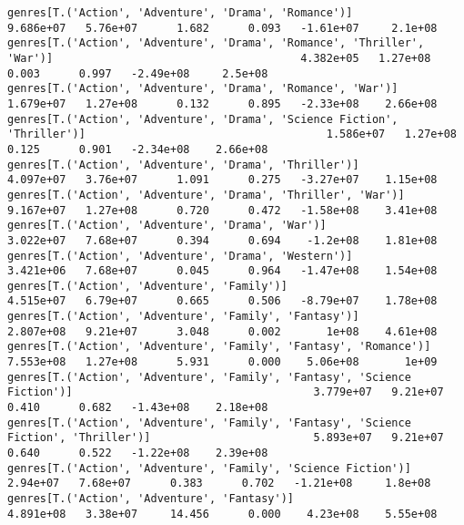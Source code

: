 \documentclass[11pt]{article}
\begin{document}
\begin{Verbatim}[commandchars=\\\{\}]
genres[T.('Action', 'Adventure', 'Drama', 'Romance')]                                                         9.686e+07   5.76e+07      1.682      0.093   -1.61e+07     2.1e+08
genres[T.('Action', 'Adventure', 'Drama', 'Romance', 'Thriller', 'War')]                                      4.382e+05   1.27e+08      0.003      0.997   -2.49e+08     2.5e+08
genres[T.('Action', 'Adventure', 'Drama', 'Romance', 'War')]                                                  1.679e+07   1.27e+08      0.132      0.895   -2.33e+08    2.66e+08
genres[T.('Action', 'Adventure', 'Drama', 'Science Fiction', 'Thriller')]                                     1.586e+07   1.27e+08      0.125      0.901   -2.34e+08    2.66e+08
genres[T.('Action', 'Adventure', 'Drama', 'Thriller')]                                                        4.097e+07   3.76e+07      1.091      0.275   -3.27e+07    1.15e+08
genres[T.('Action', 'Adventure', 'Drama', 'Thriller', 'War')]                                                 9.167e+07   1.27e+08      0.720      0.472   -1.58e+08    3.41e+08
genres[T.('Action', 'Adventure', 'Drama', 'War')]                                                             3.022e+07   7.68e+07      0.394      0.694    -1.2e+08    1.81e+08
genres[T.('Action', 'Adventure', 'Drama', 'Western')]                                                         3.421e+06   7.68e+07      0.045      0.964   -1.47e+08    1.54e+08
genres[T.('Action', 'Adventure', 'Family')]                                                                   4.515e+07   6.79e+07      0.665      0.506   -8.79e+07    1.78e+08
genres[T.('Action', 'Adventure', 'Family', 'Fantasy')]                                                        2.807e+08   9.21e+07      3.048      0.002       1e+08    4.61e+08
genres[T.('Action', 'Adventure', 'Family', 'Fantasy', 'Romance')]                                             7.553e+08   1.27e+08      5.931      0.000    5.06e+08       1e+09
genres[T.('Action', 'Adventure', 'Family', 'Fantasy', 'Science Fiction')]                                     3.779e+07   9.21e+07      0.410      0.682   -1.43e+08    2.18e+08
genres[T.('Action', 'Adventure', 'Family', 'Fantasy', 'Science Fiction', 'Thriller')]                         5.893e+07   9.21e+07      0.640      0.522   -1.22e+08    2.39e+08
genres[T.('Action', 'Adventure', 'Family', 'Science Fiction')]                                                 2.94e+07   7.68e+07      0.383      0.702   -1.21e+08     1.8e+08
genres[T.('Action', 'Adventure', 'Fantasy')]                                                                  4.891e+08   3.38e+07     14.456      0.000    4.23e+08    5.55e+08

\end{Verbatim}
\end{document}
